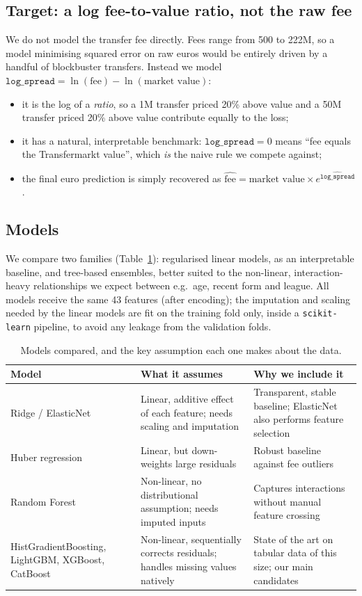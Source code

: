 \documentclass[11pt]{article}
\begin{document}
\subsection{Target: a log fee-to-value ratio, not the raw fee}
We do not model the transfer fee directly. Fees range from \texteuro{}500 to
\texteuro{}222M, so a model minimising squared error on raw euros would be
entirely driven by a handful of blockbuster transfers. Instead we model
$\texttt{log\_spread} = \ln(\text{fee}) - \ln(\text{market value})$:
\begin{itemize}
    \item it is the log of a \emph{ratio}, so a \texteuro{}1M transfer priced 20\%
    above value and a \texteuro{}50M transfer priced 20\% above value contribute
    equally to the loss;
    \item it has a natural, interpretable benchmark: $\texttt{log\_spread}=0$
    means ``fee equals the Transfermarkt value'', which \emph{is} the naive
    rule we compete against;
    \item the final euro prediction is simply recovered as
    $\widehat{\text{fee}} = \text{market value} \times e^{\widehat{\texttt{log\_spread}}}$.
\end{itemize}

\subsection{Models}
We compare two families (Table~\ref{tab:models}): regularised linear models,
as an interpretable baseline, and tree-based ensembles, better suited to the
non-linear, interaction-heavy relationships we expect between e.g.\ age,
recent form and league. All models receive the same 43 features (after
encoding); the imputation and scaling needed by the linear models are fit on
the training fold only, inside a \texttt{scikit-learn} pipeline, to avoid any
leakage from the validation folds.

\begin{table}[H]
\centering
\caption{Models compared, and the key assumption each one makes about the data.}
\label{tab:models}
\small
\begin{tabular}{@{}p{3.3cm}p{5.4cm}p{6cm}@{}}
\toprule
Model & What it assumes & Why we include it \\
\midrule
Ridge / ElasticNet & Linear, additive effect of each feature; needs
scaling and imputation & Transparent, stable baseline; ElasticNet also
performs feature selection \\
Huber regression & Linear, but down-weights large residuals & Robust
baseline against fee outliers \\
Random Forest & Non-linear, no distributional assumption; needs imputed
inputs & Captures interactions without manual feature crossing \\
HistGradientBoosting, LightGBM, XGBoost, CatBoost & Non-linear,
sequentially corrects residuals; handles missing values natively &
State of the art on tabular data of this size; our main candidates \\
\bottomrule
\end{tabular}
\end{table}
\end{document}
